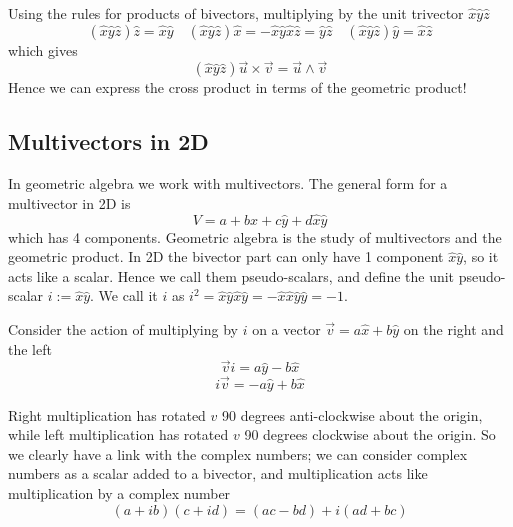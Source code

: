 \documentclass[options]{report}
\def \u{\vec{u}}
\def \v{\vec{v}}
\def \xhat{\hat{x}}
\def \yhat{\hat{y}}
\def \zhat{\hat{z}}
\begin{document}
Using the rules for products of bivectors, multiplying by the unit trivector $\xhat \yhat \zhat$
\begin{equation*}
	(\xhat \yhat \zhat) \zhat = \xhat \yhat \quad (\xhat \yhat \zhat) \xhat = - \xhat \yhat \xhat \zhat = \yhat \zhat \quad (\xhat \yhat \zhat) \yhat = \xhat \zhat
\end{equation*}
which gives
\begin{equation}
	(\xhat \yhat \zhat) \u \times \v = \u \wedge \v
\end{equation}
Hence we can express the cross product in terms of the geometric product!

\subsection{Multivectors in 2D}
In geometric algebra we work with multivectors. The general form for a multivector in 2D is
\begin{equation*}
	V = a + b\xhat + c\yhat + d\xhat\yhat
\end{equation*}
which has 4 components. Geometric algebra is the study of multivectors and the geometric product. In 2D the bivector part can only have 1 component $\xhat \yhat$, so it acts like a scalar. Hence we call them pseudo-scalars, and define the unit pseudo-scalar $i := \xhat \yhat$. We call it $i$ as $i^2 = \xhat \yhat \xhat \yhat = - \xhat \xhat \yhat \yhat = -1$.

Consider the action of multiplying by $i$ on a vector $\v = a\xhat + b\yhat$ on the right and the left
\begin{equation*}
	\v i = a \yhat - b \xhat
\end{equation*}
\begin{equation*}
	i \v = - a \yhat + b \xhat
\end{equation*}

Right multiplication has rotated $v$ 90 degrees anti-clockwise about the origin, while left multiplication has rotated $v$ 90 degrees clockwise about the origin. So we clearly have a link with the complex numbers; we can consider complex numbers as a scalar added to a bivector, and multiplication acts like multiplication by a complex number
\begin{equation*}
	\left( a + i b \right) \left( c + id \right) = \left( ac - bd \right) + i \left( ad + bc \right)
\end{equation*}
\end{document}
